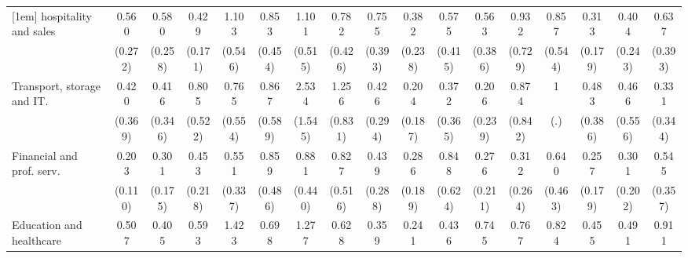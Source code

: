 {\begin{tabular}{l*{16}{c}}
[1em]
hospitality and sales&       0.560         &       0.580         &       0.429\sym{*}  &       1.103         &       0.853         &       1.101         &       0.782         &       0.755         &       0.382         &       0.575         &       0.563         &       0.932         &       0.857         &       0.313\sym{*}  &       0.404         &       0.637         \\
                    &     (0.272)         &     (0.258)         &     (0.171)         &     (0.546)         &     (0.454)         &     (0.515)         &     (0.426)         &     (0.393)         &     (0.238)         &     (0.415)         &     (0.386)         &     (0.729)         &     (0.544)         &     (0.179)         &     (0.243)         &     (0.393)         \\
[1em]
Transport, storage and IT.&       0.420         &       0.416         &       0.805         &       0.765         &       0.867         &       2.534         &       1.256         &       0.426         &       0.204         &       0.372         &       0.206         &       0.874         &           1         &       0.483         &       0.466         &       0.331         \\
                    &     (0.369)         &     (0.346)         &     (0.522)         &     (0.554)         &     (0.589)         &     (1.545)         &     (0.831)         &     (0.294)         &     (0.187)         &     (0.365)         &     (0.239)         &     (0.842)         &         (.)         &     (0.386)         &     (0.556)         &     (0.344)         \\
[1em]
Financial and prof. serv.&       0.203\sym{**} &       0.301\sym{*}  &       0.453         &       0.551         &       0.859         &       0.881         &       0.827         &       0.439         &       0.286         &       0.848         &       0.276         &       0.312         &       0.640         &       0.257         &       0.301         &       0.545         \\
                    &     (0.110)         &     (0.175)         &     (0.218)         &     (0.337)         &     (0.486)         &     (0.440)         &     (0.516)         &     (0.288)         &     (0.189)         &     (0.624)         &     (0.211)         &     (0.264)         &     (0.463)         &     (0.179)         &     (0.202)         &     (0.357)         \\
[1em]
Education and healthcare&       0.507         &       0.405         &       0.593         &       1.423         &       0.698         &       1.277         &       0.628         &       0.359         &       0.241\sym{*}  &       0.436         &       0.745         &       0.767         &       0.824         &       0.455         &       0.491         &       0.911         \\

\end{tabular}}
